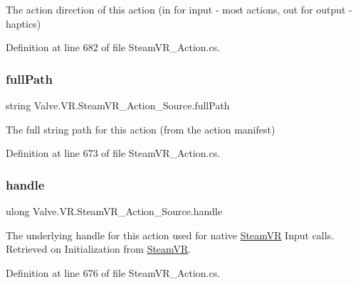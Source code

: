 The action direction of this action (in for input -\/ most actions, out for output -\/ haptics) 



Definition at line 682 of file Steam\+V\+R\+\_\+\+Action.\+cs.

\mbox{\label{class_valve_1_1_v_r_1_1_steam_v_r___action___source_acc5b9a83a017ceda67f3454bb6cefe25}} 
\subsubsection{\texorpdfstring{fullPath}{fullPath}}
{\footnotesize\ttfamily string Valve.\+V\+R.\+Steam\+V\+R\+\_\+\+Action\+\_\+\+Source.\+full\+Path\hspace{0.3cm}{\ttfamily [get]}}



The full string path for this action (from the action manifest) 



Definition at line 673 of file Steam\+V\+R\+\_\+\+Action.\+cs.

\mbox{\label{class_valve_1_1_v_r_1_1_steam_v_r___action___source_a3b11b02fd911ae14ceac84478c5fe986}} 
\subsubsection{\texorpdfstring{handle}{handle}}
{\footnotesize\ttfamily ulong Valve.\+V\+R.\+Steam\+V\+R\+\_\+\+Action\+\_\+\+Source.\+handle\hspace{0.3cm}{\ttfamily [get]}}



The underlying handle for this action used for native \mbox{\hyperlink{class_valve_1_1_v_r_1_1_steam_v_r}{Steam\+VR}} Input calls. Retrieved on Initialization from \mbox{\hyperlink{class_valve_1_1_v_r_1_1_steam_v_r}{Steam\+VR}}. 



Definition at line 676 of file Steam\+V\+R\+\_\+\+Action.\+cs.


